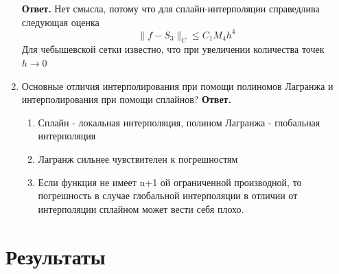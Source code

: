 \documentclass{article}
\begin{document}
\begin{enumerate}
        \newline
        {\bfseries Ответ. } 
        Нет смысла, потому что для сплайн-интерполяции справедлива следующая оценка
        \begin{equation*}
            \|f - S_3\|_C \leqslant C_1 M_4 h^4
        \end{equation*}
        Для чебышевской сетки известно, что при увеличении количества точек $h \to 0$
        \item Основные отличия интерполирования при помощи полиномов Лагранжа и интерполирования при помощи сплайнов?
        \newline
        {\bfseries Ответ. } 
        \begin{enumerate}
            \item Сплайн - локальная интерполяция, полином Лагранжа - глобальная интерполяция
            \item Лагранж сильнее чувствителен к погрешностям
            \item  Если функция не имеет n+1 ой ограниченной производной, то погрешность в случае глобальной интерполяции в отличии от интерполяции сплайном может вести себя плохо.
        \end{enumerate}
    \end{enumerate}

\section{Результаты}
\end{document}
